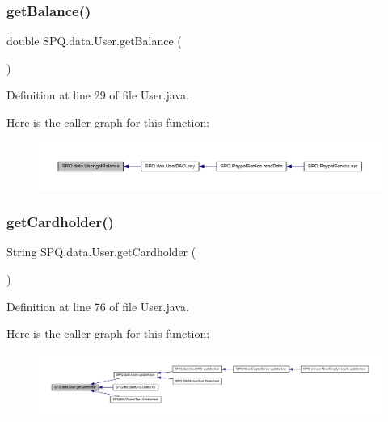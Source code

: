 \subsubsection{\texorpdfstring{get\+Balance()}{getBalance()}}
{\footnotesize\ttfamily double S\+P\+Q.\+data.\+User.\+get\+Balance (\begin{DoxyParamCaption}{ }\end{DoxyParamCaption})}



Definition at line 29 of file User.\+java.

Here is the caller graph for this function\+:
\nopagebreak
\begin{figure}[H]
\begin{center}
\leavevmode
\includegraphics[width=350pt]{class_s_p_q_1_1data_1_1_user_a03cc880edbf4758b44318af1587824e5_icgraph}
\end{center}
\end{figure}
\mbox{\label{class_s_p_q_1_1data_1_1_user_a6184a8aa1ccfc02796356f648ebf37ee}} 
\subsubsection{\texorpdfstring{get\+Cardholder()}{getCardholder()}}
{\footnotesize\ttfamily String S\+P\+Q.\+data.\+User.\+get\+Cardholder (\begin{DoxyParamCaption}{ }\end{DoxyParamCaption})}



Definition at line 76 of file User.\+java.

Here is the caller graph for this function\+:
\nopagebreak
\begin{figure}[H]
\begin{center}
\leavevmode
\includegraphics[width=350pt]{class_s_p_q_1_1data_1_1_user_a6184a8aa1ccfc02796356f648ebf37ee_icgraph}
\end{center}
\end{figure}
\mbox{\label{class_s_p_q_1_1data_1_1_user_ab847d5c61fe4980ae2a15a537b22939b}} 
